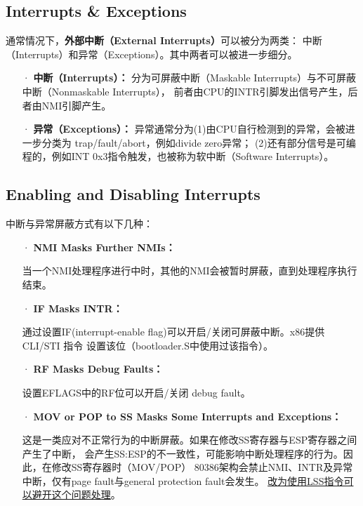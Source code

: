 \documentclass[12pt, letterpaper]{report}
\begin{document}
\subsection{\large Interrupts \& Exceptions}
通常情况下，\textbf{外部中断（External Interrupts）}可以被分为两类：
中断（Interrupts）和异常（Exceptions）。其中两者可以被进一步细分。

\begin{itemize}
    \item[·]\textbf{中断（Interrupts）：}
    分为可屏蔽中断（Maskable Interrupts）与不可屏蔽中断（Nonmaskable Interrupts），
    前者由CPU的INTR引脚发出信号产生，后者由NMI引脚产生。
    \item[·]\textbf{异常（Exceptions）：}
    异常通常分为(1)由CPU自行检测到的异常，会被进一步分类为 trap/fault/abort，例如divide zero异常；
    (2)还有部分信号是可编程的，例如INT 0x3指令触发，也被称为软中断（Software Interrupts）。
\end{itemize}

\subsection{\large Enabling and Disabling Interrupts}
中断与异常屏蔽方式有以下几种：
\begin{itemize}
    \item[·]\textbf{NMI Masks Further NMIs：}\par 
    当一个NMI处理程序进行中时，其他的NMI会被暂时屏蔽，直到处理程序执行结束。
    \item[·]\textbf{IF Masks INTR：} \par 
    通过设置IF(interrupt-enable flag)可以开启/关闭可屏蔽中断。x86提供 CLI/STI 指令
    设置该位（bootloader.S中使用过该指令）。
    \item[·]\textbf{RF Masks Debug Faults：} \par 
    设置EFLAGS中的RF位可以开启/关闭 debug fault。
    \item[·]\textbf{MOV or POP to SS Masks Some Interrupts and Exceptions：} \par 
    这是一类应对不正常行为的中断屏蔽。如果在修改SS寄存器与ESP寄存器之间产生了中断，
    会产生SS:ESP的不一致性，可能影响中断处理程序的行为。因此，在修改SS寄存器时（MOV/POP）
    80386架构会禁止NMI、INTR及异常中断，仅有page fault与general protection fault会发生。
    \underline{改为使用LSS指令可以避开这个问题处理}。
\end{itemize}
\end{document}

